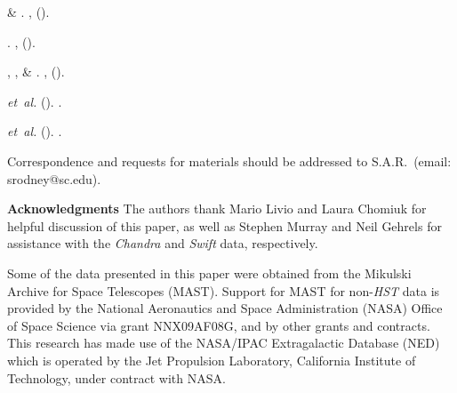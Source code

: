 \documentclass{article}
\def\Chandra{{\it Chandra}\xspace}
\def\Swift{{\it Swift}\xspace}
\begin{document}
\begin{thebibliography}{10}
 \& 
\newblock {}.
\newblock \emph{} \textbf{},
   ().

\newblock {}.
\newblock \emph{} \textbf{},
   ().

, ,
   \& 
\newblock {}.
\newblock \emph{} \textbf{},
   ().

 \emph{et~al.}
\newblock {} ().
\newblock {}.

 \emph{et~al.}
\newblock {} ().
\newblock {}.


\end{thebibliography}




\clearpage
\medskip
Correspondence and requests for materials
should be addressed to S.A.R.~(email: srodney@sc.edu).

\medskip
{\bf Acknowledgments}
The authors thank Mario Livio and Laura Chomiuk for helpful discussion
of this paper, as well as Stephen Murray and Neil Gehrels for
assistance with the \Chandra and \Swift data, respectively.

Some of the data presented in this paper were obtained from the
Mikulski Archive for Space Telescopes (MAST). Support for MAST 
for non-{\it HST} data is provided by the
National Aeronautics and Space Administration (NASA)
Office of Space Science via grant NNX09AF08G, and
by other grants and contracts.
This research has made use of the NASA/IPAC Extragalactic Database
(NED) which is operated by the Jet Propulsion Laboratory, California
Institute of Technology, under contract with NASA.
\end{document}
